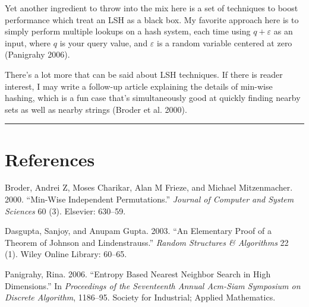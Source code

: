 \documentclass[20pt,]{extarticle}
\begin{document}
Yet another ingredient to throw into the mix here is a set of techniques
to boost performance which treat an LSH as a black box. My favorite
approach here is to simply perform multiple lookups on a hash system,
each time using \(q + \varepsilon\) as an input, where \(q\) is your
query value, and \(\varepsilon\) is a random variable centered at zero
(Panigrahy 2006).

There's a lot more that can be said about LSH techniques. If there is
reader interest, I may write a follow-up article explaining the details
of min-wise hashing, which is a fun case that's simultaneously good at
quickly finding nearby sets as well as nearby strings (Broder et al.
2000).

\begin{center}\rule{0.5\linewidth}{\linethickness}\end{center}

\section*{References}\label{references}

\hypertarget{refs}{}
\hypertarget{ref-broder2000min}{}
Broder, Andrei Z, Moses Charikar, Alan M Frieze, and Michael
Mitzenmacher. 2000. ``Min-Wise Independent Permutations.'' \emph{Journal
of Computer and System Sciences} 60 (3). Elsevier: 630--59.

\hypertarget{ref-dasgupta2003elementary}{}
Dasgupta, Sanjoy, and Anupam Gupta. 2003. ``An Elementary Proof of a
Theorem of Johnson and Lindenstrauss.'' \emph{Random Structures \&
Algorithms} 22 (1). Wiley Online Library: 60--65.

\hypertarget{ref-panigrahy2006entropy}{}
Panigrahy, Rina. 2006. ``Entropy Based Nearest Neighbor Search in High
Dimensions.'' In \emph{Proceedings of the Seventeenth Annual Acm-Siam
Symposium on Discrete Algorithm}, 1186--95. Society for Industrial;
Applied Mathematics.
\end{document}
